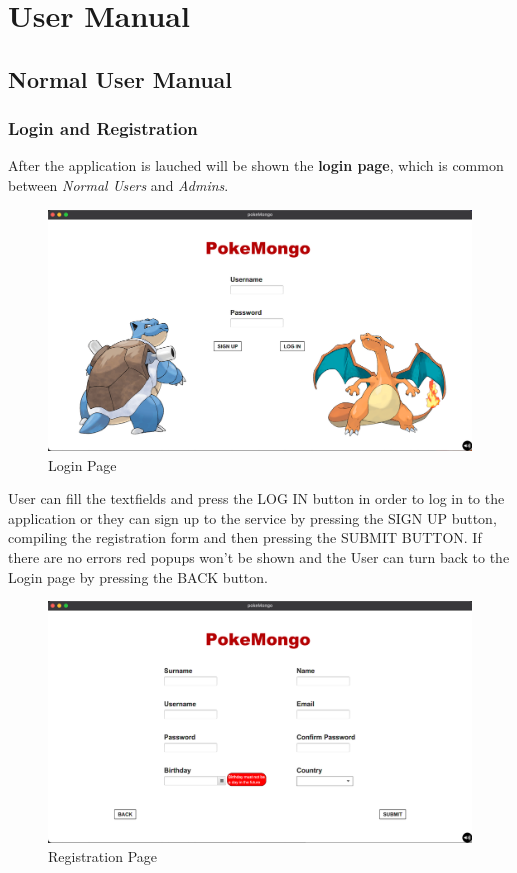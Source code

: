 \section{User Manual}
\subsection{Normal User Manual}
\subsubsection{Login and Registration}
After the application is lauched will be shown the \textbf{login page}, which is common between \textit{Normal Users} and \textit{Admins}.
\begin{figure}[H]
	\centering
	\includegraphics[width= \textwidth]{img/userManual/login.png}
	\caption{Login Page}
\end{figure}
User can fill the textfields and press the LOG IN button in order to log in to the application or they can sign up to the service by pressing the SIGN UP button, compiling the registration form and then pressing the SUBMIT BUTTON. If there are no errors red popups won't be shown and the User can turn back to the Login page by pressing the BACK button.
\begin{figure}[H]
	\centering
	\includegraphics[width=\textwidth]{img/userManual/registration.png}
	\caption{Registration Page}
\end{figure}
